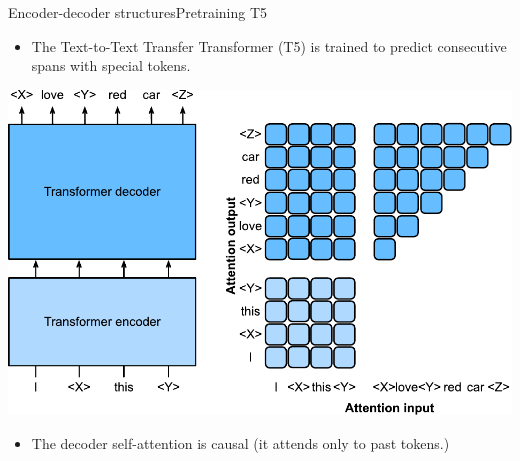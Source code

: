 \documentclass{beamer}
\begin{document}
\begin{frame}{Encoder-decoder structures}{Pretraining T5}
\vspace{-0.6cm}
\begin{itemize}
    \item The Text-to-Text Transfer Transformer (T5) is trained to predict consecutive spans with special tokens. 
\end{itemize}   
\begin{center}
    \includegraphics[scale=0.5]{Module 6 (Attention-based networks)/pics/t5-encoder-decoder.pdf}
\end{center}
\begin{itemize}
    \item The decoder self-attention is causal (it attends only to past tokens.) 
\end{itemize} 
\end{frame}
\end{document}
